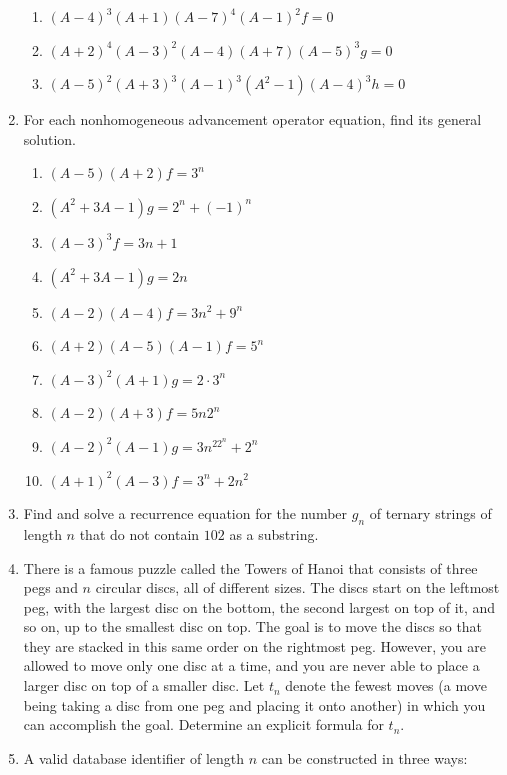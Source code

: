 \begin{enumerate}
  \begin{enumerate}
  \item $(A-4)^3(A+1)(A-7)^4(A-1)^2 f =0$
  \item $(A+2)^4(A-3)^2(A-4)(A+7)(A-5)^3g=0$
  \item $(A-5)^2(A+3)^3(A-1)^3(A^2-1)(A-4)^3h=0$
  \end{enumerate}
\item For each nonhomogeneous advancement operator equation, find its
  general solution.
  \begin{multicols}{2}
    \begin{enumerate}
    \item $(A-5)(A+2)f=3^n$
    \item $(A^2+3A-1)g = 2^n + (-1)^n$
    \item $(A-3)^3 f = 3n+1$
    \item $(A^2+3A-1)g = 2n$
    \item $(A-2)(A-4)f=3n^2 + 9^n$
    \item $(A+2)(A-5)(A-1)f = 5^n$
    \item $(A-3)^2(A+1)g=  2\cdot 3^n$
    \item $(A-2)(A+3)f=5n2^n$
    \item $(A-2)^2(A-1)g=3n^22^n + 2^n$
    \item $(A+1)^2(A-3)f = 3^n + 2n^2$
    \end{enumerate}
  \end{multicols}
\item Find and solve a recurrence equation for the number $g_n$ of
  ternary strings of length $n$ that do not contain $102$ as a
  substring. 
\item There is a famous puzzle called the Towers of Hanoi that
  consists of three pegs and $n$ circular discs, all of different
  sizes. The discs start on the leftmost peg, with the largest disc on
  the bottom, the second largest on top of it, and so on, up to the
  smallest disc on top. The goal is to move the discs so that they are
  stacked in this same order on the rightmost peg. However, you are
  allowed to move only one disc at a time, and you are never able to
  place a larger disc on top of a smaller disc. Let $t_n$ denote the
  fewest moves (a move being taking a disc from one peg and placing it
  onto another) in which you can accomplish the goal. Determine an
  explicit formula for $t_n$.
\item A valid database identifier of length $n$ can be
  constructed in three ways:
  \begin{itemize}

\end{itemize}
\end{enumerate}

